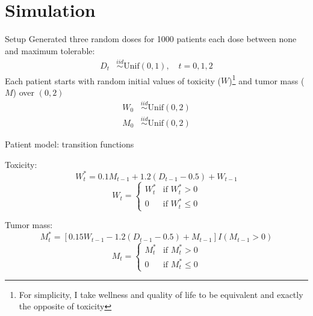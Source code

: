 \documentclass{beamer}
\begin{document}


\section{Simulation} %
\label{sec:simulation}

\begin{frame}[c]{Setup}
  Generated three random doses for 1000 patients each dose between none and maximum tolerable:
  \begin{align*}
    D_{t} &\overset{iid}{\sim} \text{Unif}(0, 1), \quad t = 0, 1, 2
  \end{align*}
  Each patient starts with random initial values of toxicity ($W$)\footnote{For simplicity, I take wellness and quality of life to be equivalent and exactly the opposite of toxicity} and tumor mass ($M$) over $(0,2)$
  \begin{align*}
    W_{0} &\overset{iid}{\sim} \text{Unif}(0, 2) \\
    M_{0} &\overset{iid}{\sim} \text{Unif}(0, 2)
  \end{align*}
\end{frame}

\begin{frame}[c]{Patient model: transition functions}
  
  Toxicity:
  \begin{equation*}
  W^{*}_{t} = 0.1 M_{t-1} + 1.2 (D_{t-1} - 0.5) + W_{t - 1}
  \end{equation*}
  \begin{equation*}
  W_{t} = \begin{cases}
    W^{*}_{t} &\text{if } W^{*}_{t} > 0 \\
    0 &\text{if } W^{*}_{t} \leq 0
  \end{cases}
  \end{equation*}
  
  Tumor mass:
  \begin{equation*}
  M^{*}_{t} = [0.15 W_{t-1} - 1.2 (D_{t-1} - 0.5) + M_{t - 1}] I(M_{t-1} > 0)
  \end{equation*}
  \begin{equation*}
  M_{t} = \begin{cases}
    M^{*}_{t} &\text{if } M^{*}_{t} > 0 \\
    0 &\text{if } M^{*}_{t} \leq 0
  \end{cases}
  \end{equation*}
  
\end{frame}
\end{document}

